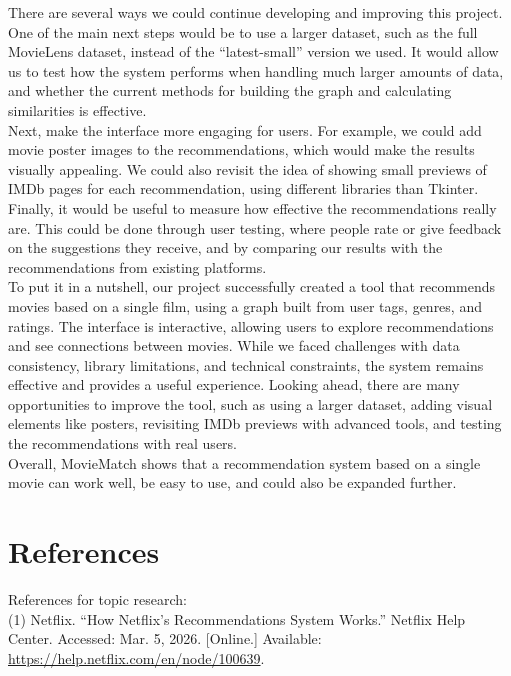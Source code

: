 \documentclass[fontsize=11pt]{article}
\begin{document}
There are several ways we could continue developing and improving this project. One of the main next steps would be to use a larger dataset, such as the full MovieLens dataset, instead of the “latest-small” version we used. It would allow us to test how the system performs when handling much larger amounts of data, and whether the current methods for building the graph and calculating similarities is effective. \\
Next, make the interface more engaging for users. For example, we could add movie poster images to the recommendations, which would make the results visually appealing. We could also revisit the idea of showing small previews of IMDb pages for each recommendation, using different libraries than Tkinter. \\
Finally, it would be useful to measure how effective the recommendations really are. This could be done through user testing, where people rate or give feedback on the suggestions they receive, and by comparing our results with the recommendations from existing platforms.\\

To put it in a nutshell, our project successfully created a tool that recommends movies based on a single film, using a graph built from user tags, genres, and ratings. The interface is interactive, allowing users to explore recommendations and see connections between movies. While we faced challenges with data consistency, library limitations, and technical constraints, the system remains effective and provides a useful experience. Looking ahead, there are many opportunities to improve the tool, such as using a larger dataset, adding visual elements like posters, revisiting IMDb previews with advanced tools, and testing the recommendations with real users. \\
Overall, MovieMatch shows that a recommendation system based on a single movie can work well, be easy to use, and could also be expanded further.

\section*{References}

\color{blue}
\indent References for topic research: \\

\color{black}
(1) Netflix. “How Netflix’s Recommendations System Works.” Netflix Help Center. Accessed: Mar. 5, 2026. [Online.] Available: \url{https://help.netflix.com/en/node/100639}. \\
\end{document}
